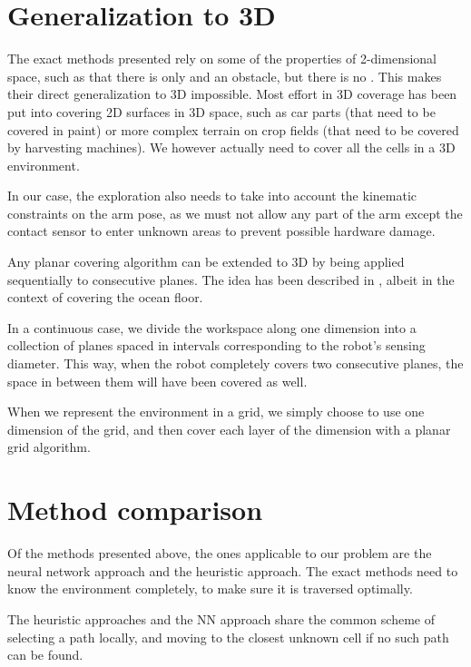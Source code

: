 \documentclass[buriama8_dp.tex]{subfiles}
\begin{document}


\section{Generalization to 3D}

The exact methods presented rely on some of the properties of 2-dimensional space, such as that there is only  and  an obstacle, but there is no . This makes their direct generalization to 3D impossible. Most effort in 3D coverage has been put into covering 2D surfaces in 3D space, such as car parts (that need to be covered in paint) or more complex terrain on crop fields (that need to be covered by harvesting machines). We however actually need to cover all the cells in a 3D environment.

In our case, the exploration also needs to take into account the kinematic constraints on the arm pose, as we must not allow any part of the arm except the contact sensor to enter unknown areas to prevent possible hardware damage.

Any planar covering algorithm can be extended to 3D by being applied sequentially to consecutive planes. The idea has been described in \cite{gen3d}, albeit in the context of covering the ocean floor.

In a continuous case, we divide the workspace along one dimension into a collection of planes spaced in intervals corresponding to the robot's sensing diameter. This way, when the robot completely covers two consecutive planes, the space in between them will have been covered as well.

When we represent the environment in a grid, we simply choose to use one dimension of the grid, and then cover each layer of the dimension with a planar grid algorithm.

\section{Method comparison}

Of the methods presented above, the ones applicable to our problem are the neural network approach and the heuristic approach. The exact methods need to know the environment completely, to make sure it is traversed optimally.


The heuristic approaches and the NN approach share the common scheme of selecting a path locally, and moving to the closest unknown cell if no such path can be found. 
\end{document}
